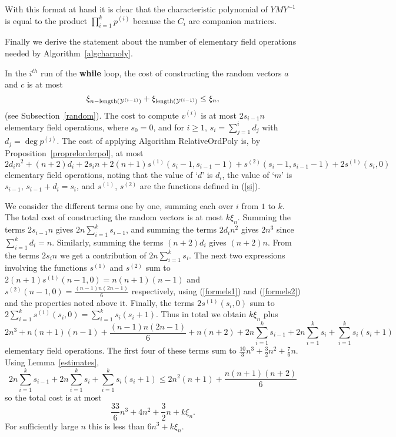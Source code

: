 With this format at hand it is clear that the characteristic polynomial
of $YMY^{-1}$ is equal to the product $\prod_{i=1}^k p^{(i)}$ because
the $C_i$ are companion matrices.

Finally we derive the statement about the number of elementary field operations
needed by Algorithm~\ref{algcharpoly}.

In the $i^{th}$ run of the {\bf while} loop, the cost of constructing the
random vectors $a$ and $c$ is at most 
\[ \xi_{n-\mathrm{length}(\mathcal{Y}^{(i-1)})}+\xi_{\mathrm{length}(\mathcal{Y}^{(i-1)})}
\leq \xi_{n}, 
\]
(see Subsection~\ref{random}). The cost to compute $v^{(i)}$ is 
at most $2s_{i-1}n$ elementary field operations,
where $s_0=0$, and for $i\geq1$, $s_{i}=\sum_{j=1}^{i}d_j$ with 
$d_j=\deg p^{(j)}$. The cost 
of applying Algorithm {\sc RelativeOrdPoly}
is, by Proposition~\ref{proprelorderpol}, at most
\[ 
2d_in^2 + (n+2)d_i +2s_{i}n + 2(n+1)s^{(1)}(s_i-1,s_{i-1}-1) 
+ s^{(2)}(s_i-1,s_{i-1}-1) + 2s^{(1)}(s_i,0) 
\]
elementary field operations, noting that the value 
of `$d$' is $d_i$, the value of `$m$' is $s_{i-1}$, $s_{i-1}+d_i=s_i$,
and $s^{(1)}$, $s^{(2)}$ are the functions defined in (\ref{si}).

We consider the different terms
one by one, summing each over $i$ from $1$ to $k$. 
The total cost of constructing the random vectors is at most $k\xi_{n}$.
Summing the terms $2 s_{i-1} n$ gives $2n\sum_{i=1}^{k} s_{i-1}$, and
summing the terms $2d_in^2$ gives $2n^3$ since $\sum_{i=1}^k d_i=n$. 
Similarly, summing the terms
$(n+2)d_i$ gives $(n+2)n$. From the terms $2s_in$ we
get a contribution of 
$2n \sum_{i=1}^{k} s_i$.
The next two expressions involving the functions $s^{(1)}$ and $s^{(2)}$
sum to $2(n+1)s^{(1)}(n-1,0) = n(n+1)(n-1)$ and $s^{(2)}(n-1,0) = 
\frac{(n-1)n(2n-1)}{6}$ respectively, using (\ref{formels1}) and
(\ref{formels2}) and the properties noted
above it. 
Finally, the terms $2s^{(1)}(s_i,0)$ sum to 
$2\sum_{i=1}^k s^{(1)}(s_i,0) 
= \sum_{i=1}^k s_i(s_i+1)$.
Thus in total we obtain $k\xi_n$ plus
\[ 2n^3
   +n(n+1)(n-1)
   +\frac{(n-1)n(2n-1)}{6}
   +n(n+2)
   +2n\sum_{i=1}^k s_{i-1}
   +2n\sum_{i=1}^k s_i
   +\sum_{i=1}^k s_i(s_i+1) 
\]
elementary field operations. The first four of these terms sum to $\frac{10}{3}n^3
   +\frac{3}{2}n^2
   +\frac{7}{6}n$. 
Using Lemma~\ref{estimates},
\[ 
   2n\sum_{i=1}^k s_{i-1}
   +2n\sum_{i=1}^k s_i
   +\sum_{i=1}^k s_i(s_i+1)\leq 2n^2(n+1)+\frac{n(n+1)(n+2)}{6} \]
so the total cost is at most 
\[
\frac{33}{6}n^3+4n^2+\frac{3}{2}n +k\xi_n.
\]
For sufficiently large $n$ this is less than $6n^3+k\xi_n$.
\proofend


